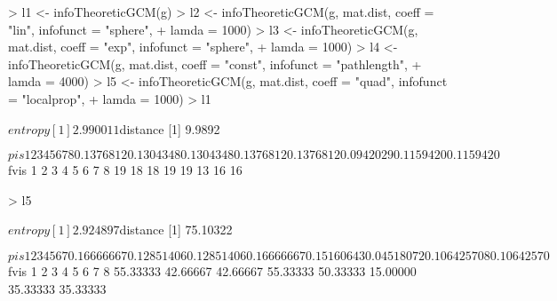 \documentclass[a4paper]{article}
\begin{document}
\begin{Schunk}
\begin{Sinput}
> l1 <- infoTheoreticGCM(g)
> l2 <- infoTheoreticGCM(g, mat.dist, coeff = "lin", infofunct = "sphere", 
+     lamda = 1000)
> l3 <- infoTheoreticGCM(g, mat.dist, coeff = "exp", infofunct = "sphere", 
+     lamda = 1000)
> l4 <- infoTheoreticGCM(g, mat.dist, coeff = "const", infofunct = "pathlength", 
+     lamda = 4000)
> l5 <- infoTheoreticGCM(g, mat.dist, coeff = "quad", infofunct = "localprop", 
+     lamda = 1000)
> l1
\end{Sinput}
\begin{Soutput}
$entropy
[1] 2.990011

$distance
[1] 9.9892

$pis
        1         2         3         4         5         6         7         8 
0.1376812 0.1304348 0.1304348 0.1376812 0.1376812 0.0942029 0.1159420 0.1159420 

$fvis
 1  2  3  4  5  6  7  8 
19 18 18 19 19 13 16 16 
\end{Soutput}
\begin{Sinput}
> l5
\end{Sinput}
\begin{Soutput}
$entropy
[1] 2.924897

$distance
[1] 75.10322

$pis
         1          2          3          4          5          6          7 
0.16666667 0.12851406 0.12851406 0.16666667 0.15160643 0.04518072 0.10642570 
         8 
0.10642570 

$fvis
       1        2        3        4        5        6        7        8 
55.33333 42.66667 42.66667 55.33333 50.33333 15.00000 35.33333 35.33333 
\end{Soutput}
\end{Schunk}



\end{document}
